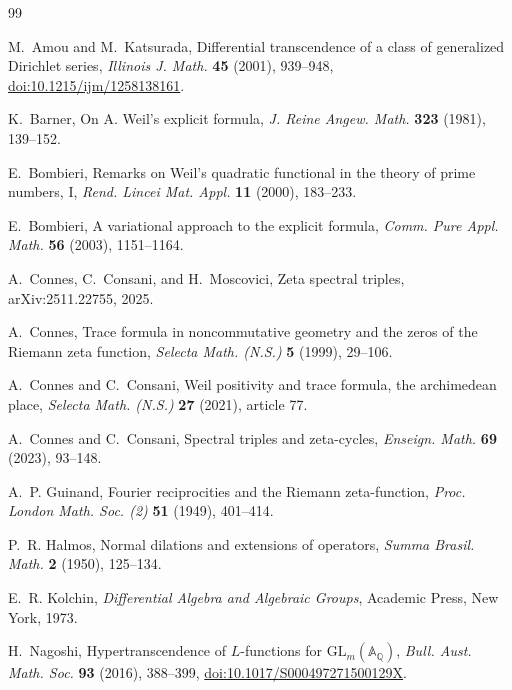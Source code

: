 \documentclass[11pt]{article}
\theoremstyle{definition}
\theoremstyle{remark}
\begin{document}
\begin{thebibliography}{99}
\small

M.~Amou and M.~Katsurada,
\newblock Differential transcendence of a class of generalized Dirichlet series,
\newblock \emph{Illinois J. Math.} \textbf{45} (2001), 939--948,
\newblock \href{https://doi.org/10.1215/ijm/1258138161}{doi:10.1215/ijm/1258138161}.

K.~Barner,
\newblock On A. Weil's explicit formula,
\newblock \emph{J. Reine Angew. Math.} \textbf{323} (1981), 139--152.

E.~Bombieri,
\newblock Remarks on Weil's quadratic functional in the theory of prime numbers, I,
\newblock \emph{Rend. Lincei Mat. Appl.} \textbf{11} (2000), 183--233.

E.~Bombieri,
\newblock A variational approach to the explicit formula,
\newblock \emph{Comm. Pure Appl. Math.} \textbf{56} (2003), 1151--1164.

A.~Connes, C.~Consani, and H.~Moscovici,
\newblock Zeta spectral triples,
\newblock arXiv:2511.22755, 2025.

A.~Connes,
\newblock Trace formula in noncommutative geometry and the zeros of the Riemann zeta function,
\newblock \emph{Selecta Math. (N.S.)} \textbf{5} (1999), 29--106.

A.~Connes and C.~Consani,
\newblock Weil positivity and trace formula, the archimedean place,
\newblock \emph{Selecta Math. (N.S.)} \textbf{27} (2021), article 77.

A.~Connes and C.~Consani,
\newblock Spectral triples and zeta-cycles,
\newblock \emph{Enseign. Math.} \textbf{69} (2023), 93--148.

A.~P. Guinand,
\newblock Fourier reciprocities and the Riemann zeta-function,
\newblock \emph{Proc. London Math. Soc. (2)} \textbf{51} (1949), 401--414.

P.~R. Halmos,
\newblock Normal dilations and extensions of operators,
\newblock \emph{Summa Brasil. Math.} \textbf{2} (1950), 125--134.

E.~R. Kolchin,
\newblock \emph{Differential Algebra and Algebraic Groups},
\newblock Academic Press, New York, 1973.

H.~Nagoshi,
\newblock Hypertranscendence of \(L\)-functions for
\(\mathrm{GL}_m(\mathbb A_{\mathbb Q})\),
\newblock \emph{Bull. Aust. Math. Soc.} \textbf{93} (2016), 388--399,
\newblock \href{https://doi.org/10.1017/S000497271500129X}
{doi:10.1017/S000497271500129X}.


\end{thebibliography}
\end{document}
